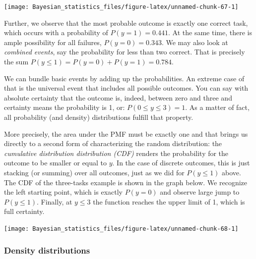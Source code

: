 \documentclass[]{svmono}
\newenvironment{Shaded}{\begin{snugshade}}{\end{snugshade}}
\newcommand{\KeywordTok}[1]{\textcolor[rgb]{0.13,0.29,0.53}{\textbf{#1}}}
\newcommand{\DataTypeTok}[1]{\textcolor[rgb]{0.13,0.29,0.53}{#1}}
\newcommand{\DecValTok}[1]{\textcolor[rgb]{0.00,0.00,0.81}{#1}}
\newcommand{\StringTok}[1]{\textcolor[rgb]{0.31,0.60,0.02}{#1}}
\newcommand{\OperatorTok}[1]{\textcolor[rgb]{0.81,0.36,0.00}{\textbf{#1}}}
\newcommand{\NormalTok}[1]{#1}
\begin{document}
\texttt{[image: Bayesian\_statistics\_files/figure-latex/unnamed-chunk-67-1]}

Further, we observe that the most probable outcome is exactly one
correct task, which occurs with a probability of \(P(y = 1) = 0.441\).
At the same time, there is ample possibility for all failures,
\(P(y = 0) = 0.343\). We may also look at \emph{combined events}, say
the probability for less than two correct. That is precisely the sum
\(P(y \leq 1) = P(y = 0) + P(y = 1) = 0.784\).

We can bundle basic events by adding up the probabilities. An extreme
case of that is the universal event that includes all possible outcomes.
You can say with absolute certainty that the outcome is, indeed, between
zero and three and certainty means the probability is 1, or:
\(P(0 \leq y \leq 3) = 1\). As a matter of fact, all probability (and
density) distributions fulfill that property.

More precisely, the area under the PMF must be exactly one and that
brings us directly to a second form of characterizing the random
distribution: the \emph{cumulative distribution distribution (CDF)}
renders the probability for the outcome to be smaller or equal to \(y\).
In the case of discrete outcomes, this is just stacking (or summing)
over all outcomes, just as we did for \(P(y\leq1)\) above. The CDF of
the three-tasks example is shown in the graph below. We recognize the
left starting point, which is exactly \(P(y = 0)\) and observe large
jump to \(P(y \leq 1)\). Finally, at \(y \leq 3\) the function reaches
the upper limit of 1, which is full certainty.

\begin{Shaded}
\end{Shaded}

\texttt{[image: Bayesian\_statistics\_files/figure-latex/unnamed-chunk-68-1]}

\subsubsection{Density distributions}\label{density-distributions}
\end{document}
